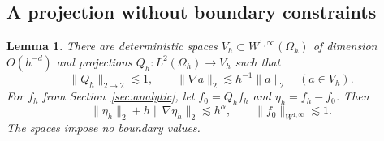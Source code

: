 \documentclass[11pt]{article}
\newtheorem{lemma}[theorem]{Lemma}
\theoremstyle{remark}
\newcommand{\norm}[1]{\lVert #1\rVert}
\begin{document}
\subsection{A projection without boundary constraints}
\begin{lemma}\label{lem:projection}
There are deterministic spaces $V_h\subset W^{1,\infty}(\Omega_h)$ of dimension $O(h^{-d})$ and projections $Q_h:L^2(\Omega_h)\to V_h$ such that
\begin{equation}\label{eq:projectionbounds}
 \norm{Q_h}_{2\to2}\lesssim1,\qquad
 \norm{\nabla a}_2\lesssim h^{-1}\norm a_2\quad(a\in V_h).
\end{equation}
For $f_h$ from Section~\ref{sec:analytic}, let $f_0=Q_hf_h$ and $\eta_h=f_h-f_0$. Then
\begin{equation}\label{eq:approx}
 \norm{\eta_h}_2+h\norm{\nabla\eta_h}_2\lesssim h^\alpha,
 \qquad \norm{f_0}_{W^{1,\infty}}\lesssim1.
\end{equation}
The spaces impose no boundary values.
\end{lemma}
\end{document}
